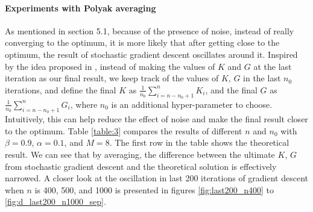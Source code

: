 \documentclass{article}
\begin{document}
\paragraph{Experiments with Polyak averaging}
As mentioned in section 5.1, because of the presence of noise, instead of really converging to the optimum, it is more likely that after getting close to the optimum, the result of stochastic gradient descent oscillates around it. Inspired by the idea proposed in \cite{Polyak:1992:ASA:131092.131098}, instead of making the values of $K$ and $G$ at the last iteration as our final result, we keep track of the values of $K$, $G$ in the last $n_0$ iterations, and define the final $K$ as $\frac{1}{n_0}\sum_{i=n-n_0+1}^{n} K_i$, and the final $G$ as $\frac{1}{n_0}\sum_{i=n-n_0+1}^{n} G_i$, where $n_0$ is an additional hyper-parameter to choose. Intuitively, this can help reduce the effect of noise and make the final result closer to the optimum. Table \ref{table:3} compares the results of different $n$ and $n_0$ with $\beta = 0.9$, $\alpha = 0.1$, and $M = 8$. The first row in the table shows the theoretical result. We can see that by averaging, the difference between the ultimate $K$, $G$ from stochastic gradient descent and the theoretical solution is effectively narrowed. A closer look at the oscillation in last 200 iterations of gradient descent when $n$ is 400, 500, and 1000 is presented in figures \ref{fig:last200_n400} to \ref{fig:d_last200_n1000_sep}.\\
\end{document}
